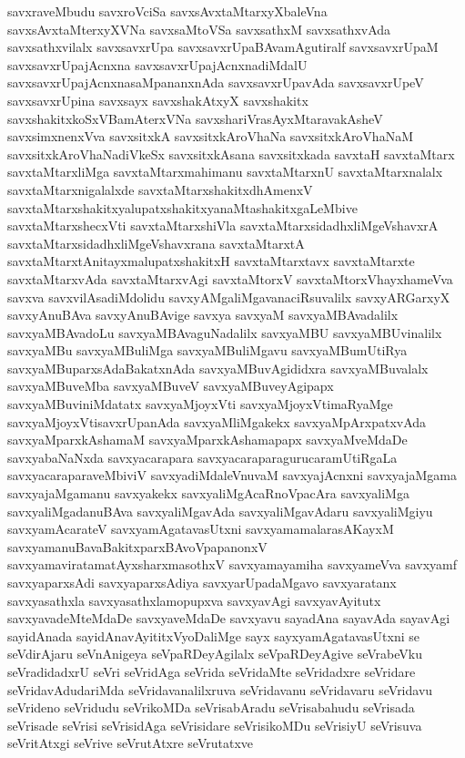 {savxraveMbudu
savxroVciSa
savxsAvxtaMtarxyXbaleVna
savxsAvxtaMterxyXVNa
savxsaMtoVSa
savxsathxM
savxsathxvAda
savxsathxvilalx
savxsavxrUpa
savxsavxrUpaBAvamAgutiralf
savxsavxrUpaM
savxsavxrUpajAcnxna
savxsavxrUpajAcnxnadiMdalU
savxsavxrUpajAcnxnasaMpananxnAda
savxsavxrUpavAda
savxsavxrUpeV
savxsavxrUpina
savxsayx
savxshakAtxyX
savxshakitx
savxshakitxkoSxVBamAterxVNa
savxshariVrasAyxMtaravakAsheV
savxsimxnenxVva
savxsitxkA
savxsitxkAroVhaNa
savxsitxkAroVhaNaM
savxsitxkAroVhaNadiVkeSx
savxsitxkAsana
savxsitxkada
savxtaH
savxtaMtarx
savxtaMtarxliMga
savxtaMtarxmahimanu
savxtaMtarxnU
savxtaMtarxnalalx
savxtaMtarxnigalalxde
savxtaMtarxshakitxdhAmenxV
savxtaMtarxshakitxyalupatxshakitxyanaMtashakitxgaLeMbive
savxtaMtarxshecxVti
savxtaMtarxshiVla
savxtaMtarxsidadhxliMgeVshavxrA
savxtaMtarxsidadhxliMgeVshavxrana
savxtaMtarxtA
savxtaMtarxtAnitayxmalupatxshakitxH
savxtaMtarxtavx
savxtaMtarxte
savxtaMtarxvAda
savxtaMtarxvAgi
savxtaMtorxV
savxtaMtorxVhayxhameVva
savxva
savxvilAsadiMdolidu
savxyAMgaliMgavanaciRsuvalilx
savxyARGarxyX
savxyAnuBAva
savxyAnuBAvige
savxya
savxyaM
savxyaMBAvadalilx
savxyaMBAvadoLu
savxyaMBAvaguNadalilx
savxyaMBU
savxyaMBUvinalilx
savxyaMBu
savxyaMBuliMga
savxyaMBuliMgavu
savxyaMBumUtiRya
savxyaMBuparxsAdaBakatxnAda
savxyaMBuvAgididxra
savxyaMBuvalalx
savxyaMBuveMba
savxyaMBuveV
savxyaMBuveyAgipapx
savxyaMBuviniMdatatx
savxyaMjoyxVti
savxyaMjoyxVtimaRyaMge
savxyaMjoyxVtisavxrUpanAda
savxyaMliMgakekx
savxyaMpArxpatxvAda
savxyaMparxkAshamaM
savxyaMparxkAshamapapx
savxyaMveMdaDe
savxyabaNaNxda
savxyacarapara
savxyacaraparagurucaramUtiRgaLa
savxyacaraparaveMbiviV
savxyadiMdaleVnuvaM
savxyajAcnxni
savxyajaMgama
savxyajaMgamanu
savxyakekx
savxyaliMgAcaRnoVpacAra
savxyaliMga
savxyaliMgadanuBAva
savxyaliMgavAda
savxyaliMgavAdaru
savxyaliMgiyu
savxyamAcarateV
savxyamAgatavasUtxni
savxyamamalarasAKayxM
savxyamanuBavaBakitxparxBAvoVpapanonxV
savxyamaviratamatAyxsharxmasothxV
savxyamayamiha
savxyameVva
savxyamf
savxyaparxsAdi
savxyaparxsAdiya
savxyarUpadaMgavo
savxyaratanx
savxyasathxla
savxyasathxlamopupxva
savxyavAgi
savxyavAyitutx
savxyavadeMteMdaDe
savxyaveMdaDe
savxyavu
sayadAna
sayavAda
sayavAgi
sayidAnada
sayidAnavAyititxVyoDaliMge
sayx
sayxyamAgatavasUtxni
se
seVdirAjaru
seVnAnigeya
seVpaRDeyAgilalx
seVpaRDeyAgive
seVrabeVku
seVradidadxrU
seVri
seVridAga
seVrida
seVridaMte
seVridadxre
seVridare
seVridavAdudariMda
seVridavanalilxruva
seVridavanu
seVridavaru
seVridavu
seVrideno
seVridudu
seVrikoMDa
seVrisabAradu
seVrisabahudu
seVrisada
seVrisade
seVrisi
seVrisidAga
seVrisidare
seVrisikoMDu
seVrisiyU
seVrisuva
seVritAtxgi
seVrive
seVrutAtxre
seVrutatxve
}

